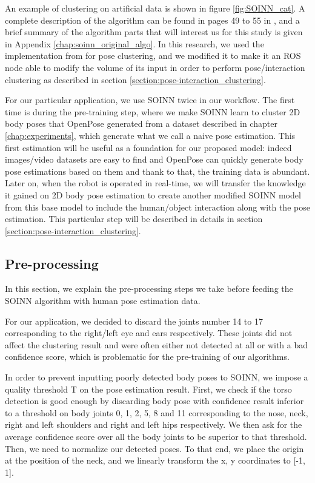 An example of clustering on artificial data is shown in figure \ref{fig:SOINN_cat}. A complete description of the algorithm can be found in pages 49 to 55 in \cite{SOINN}, and a brief summary of the algorithm parts that will interest us for this study is given in Appendix \ref{chap:soinn_original_algo}. In this research, we used the implementation from \cite{soinn_implementation} for pose clustering, and we modified it to make it an ROS node able to modify the volume of its input in order to perform pose/interaction clustering as described in section \ref{section:pose-interaction_clustering}.

For our particular application, we use SOINN twice in our workflow. The first time is during the pre-training step, where we make SOINN learn to cluster 2D body poses that OpenPose generated from a dataset described in chapter \ref{chap:experiments}, which generate what we call a naive pose estimation. This first estimation will be useful as a foundation for our proposed model: indeed images/video datasets are easy to find and OpenPose can quickly generate body pose estimations based on them and thank to that, the training data is abundant. Later on, when the robot is operated in real-time, we will transfer the knowledge it gained on 2D body pose estimation to create another modified SOINN model from this base model to include the human/object interaction along with the pose estimation. This particular step will be described in details in section \ref{section:pose-interaction_clustering}.

\subsection{Pre-processing}
In this section, we explain the pre-processing steps we take before feeding the SOINN algorithm with human pose estimation data.

For our application, we decided to discard the joints number 14 to 17 corresponding to the right/left eye and ears respectively. These joints did not affect the clustering result and were often either not detected at all or with a bad confidence score, which is problematic for the pre-training of our algorithms.

In order to prevent inputting poorly detected body poses to SOINN, we impose a quality threshold T on the pose estimation result. First, we check if the torso detection is good enough by discarding body pose with confidence result inferior to a threshold on body joints 0, 1, 2, 5, 8 and 11 corresponding to the nose, neck, right and left shoulders and right and left hips respectively. We then ask for the average confidence score over all the body joints to be superior to that threshold.
Then, we need to normalize our detected poses. To that end, we place the origin at the position of the neck, and we linearly transform the x, y coordinates to [-1, 1].

